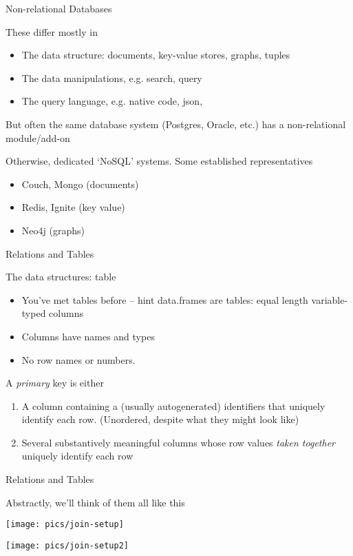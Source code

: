 \documentclass{hertieteaching}
\begin{document}
\begin{frame}{Non-relational Databases}

These differ mostly in
\begin{itemize}
  \item The data structure: documents, key-value stores, graphs, tuples
  \item The data manipulations, e.g. search, query
  \item The query language, e.g. native code, \textsf{json}, 
\end{itemize}
But often the same database system (\textsf{Postgres}, \textsf{Oracle}, etc.) has a non-relational module/add-on

Otherwise, dedicated `NoSQL' systems. Some established representatives
\begin{itemize}
  \item \textsf{Couch}, \textsf{Mongo} (documents)
  \item \textsf{Redis}, \textsf{Ignite} (key value)
  \item \textsf{Neo4j} (graphs)
\end{itemize}
 
\end{frame}

\begin{frame}{Relations and Tables}

The data structures: table
\begin{itemize}
  \item You've met tables before -- hint \textsf{data.frame}s are tables: equal length variable-typed columns 
  \item Columns have names and types
  \item No row names or numbers. 
\end{itemize}
\pause

A \textit{primary} key is either
\begin{enumerate}
  \item A column containing a (usually autogenerated) identifiers that uniquely identify each row.  (Unordered, despite what they might look like)
  \item Several substantively meaningful columns whose row values \textit{taken together} uniquely identify each row
\end{enumerate}

\end{frame}

\begin{frame}{Relations and Tables}

Abstractly, we'll think of them all like this

\bigskip
\centerline{\texttt{[image: pics/join-setup]}}

\bigskip
\centerline{\texttt{[image: pics/join-setup2]}}

  
\end{frame}
\end{document}
